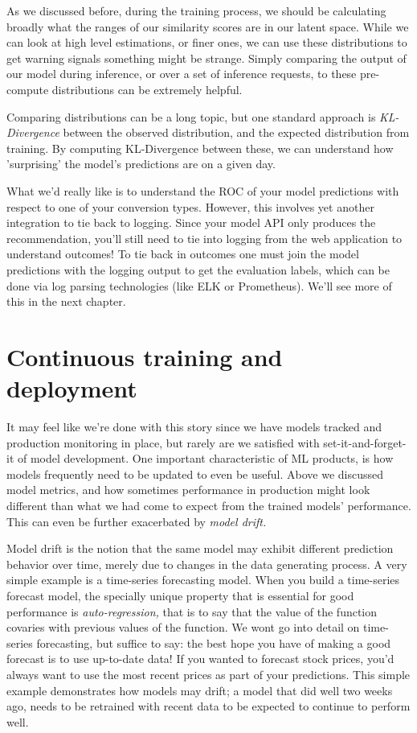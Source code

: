 As we discussed before, during the training process, we should be calculating broadly what the ranges of our similarity scores are in our latent space. While we can look at high level estimations, or finer ones, we can use these distributions to get warning signals something might be strange. Simply comparing the output of our model during inference, or over a set of inference requests, to these pre-compute distributions can be extremely helpful.

Comparing distributions can be a long topic, but one standard approach is \emph{KL-Divergence} between the observed distribution, and the expected distribution from training. By computing KL-Divergence between these, we can understand how 'surprising' the model's predictions are on a given day. 

What we'd really like is to understand the ROC of your model predictions with respect to one of your conversion types. However, this involves yet another integration to tie back to logging. Since your model API only produces the recommendation, you'll still need to tie into logging from the web application to understand outcomes! To tie back in outcomes one must join the model predictions with the logging output to get the evaluation labels, which can be done via log parsing technologies (like ELK or Prometheus). We'll see more of this in the next chapter. 

\section{Continuous training and deployment}

It may feel like we're done with this story since we have models tracked and production monitoring in place, but rarely are we satisfied with set-it-and-forget-it of model development. One important characteristic of ML products, is how models frequently need to be updated to even be useful. Above we discussed model metrics, and how sometimes performance in production might look different than what we had come to expect from the trained models' performance. This can even be further exacerbated by \emph{model drift.}

Model drift is the notion that the same model may exhibit different prediction behavior over time, merely due to changes in the data generating process. A very simple example is a time-series forecasting model. When you build a time-series forecast model, the specially unique property that is essential for good performance is \emph{auto-regression,} that is to say that the value of the function covaries with previous values of the function. We wont go into detail on time-series forecasting, but suffice to say: the best hope you have of making a good forecast is to use up-to-date data! If you wanted to forecast stock prices, you'd always want to use the most recent prices as part of your predictions. This simple example demonstrates how models may drift; a model that did well two weeks ago, needs to be retrained with recent data to be expected to continue to perform well.

